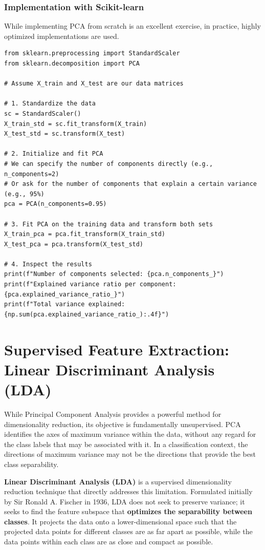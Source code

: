 \subsubsection*{Implementation with Scikit-learn}
While implementing PCA from scratch is an excellent exercise, in practice, highly optimized implementations are used.
\begin{verbatim}
from sklearn.preprocessing import StandardScaler
from sklearn.decomposition import PCA

# Assume X_train and X_test are our data matrices

# 1. Standardize the data
sc = StandardScaler()
X_train_std = sc.fit_transform(X_train)
X_test_std = sc.transform(X_test)

# 2. Initialize and fit PCA
# We can specify the number of components directly (e.g., n_components=2)
# Or ask for the number of components that explain a certain variance (e.g., 95%)
pca = PCA(n_components=0.95)

# 3. Fit PCA on the training data and transform both sets
X_train_pca = pca.fit_transform(X_train_std)
X_test_pca = pca.transform(X_test_std)

# 4. Inspect the results
print(f"Number of components selected: {pca.n_components_}")
print(f"Explained variance ratio per component: {pca.explained_variance_ratio_}")
print(f"Total variance explained: {np.sum(pca.explained_variance_ratio_):.4f}")
\end{verbatim}

\section{Supervised Feature Extraction: Linear Discriminant Analysis (LDA)}
\label{sec:lda}

While Principal Component Analysis provides a powerful method for dimensionality reduction, its objective is fundamentally unsupervised. PCA identifies the axes of maximum variance within the data, without any regard for the class labels that may be associated with it. In a classification context, the directions of maximum variance may not be the directions that provide the best class separability.

\textbf{Linear Discriminant Analysis (LDA)} is a supervised dimensionality reduction technique that directly addresses this limitation. Formulated initially by Sir Ronald A. Fischer in 1936, LDA does not seek to preserve variance; it seeks to find the feature subspace that \textbf{optimizes the separability between classes}. It projects the data onto a lower-dimensional space such that the projected data points for different classes are as far apart as possible, while the data points within each class are as close and compact as possible.

